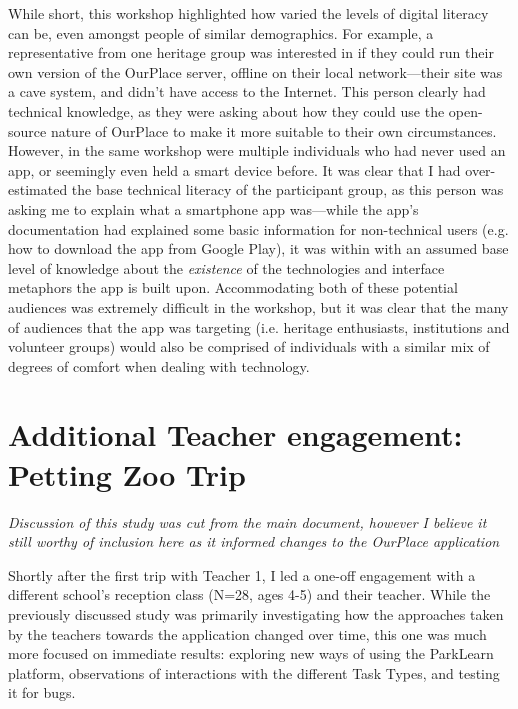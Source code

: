 While short, this workshop highlighted how varied the levels of digital literacy can be, even amongst people of similar demographics. For example, a representative from one heritage group was interested in if they could run their own version of the OurPlace server, offline on their local network---their site was a cave system, and didn't have access to the Internet. This person clearly had technical knowledge, as they were asking about how they could use the open-source nature of OurPlace to make it more suitable to their own circumstances. However, in the same workshop were multiple individuals who had never used an app, or seemingly even held a smart device before. It was clear that I had over-estimated the base technical literacy of the participant group, as this person was asking me to explain what a smartphone app was---while the app's documentation had explained some basic information for non-technical users (e.g. how to download the app from Google Play), it was within with an assumed base level of knowledge about the \textit{existence} of the technologies and interface metaphors the app is built upon. Accommodating both of these potential audiences was extremely difficult in the workshop, but it was clear that the many of audiences that the app was targeting (i.e. heritage enthusiasts, institutions and volunteer groups) would also be comprised of individuals with a similar mix of degrees of comfort when dealing with technology.

\section{Additional Teacher engagement: Petting Zoo Trip}
\label{app:pettingzoo}

\textit{Discussion of this study was cut from the main document, however I believe it still worthy of inclusion here as it informed changes to the OurPlace application}

Shortly after the first trip with Teacher 1, I led a one-off engagement with a different school's reception class (N=28, ages 4-5) and their teacher. While the previously discussed study was primarily investigating how the approaches taken by the teachers towards the application changed over time, this one was much more focused on immediate results: exploring new ways of using the ParkLearn platform, observations of interactions with the different Task Types, and testing it for bugs. 


